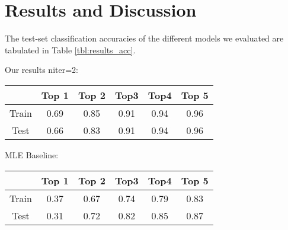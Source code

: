 \section{Results and Discussion}
\label{sec:results}
The test-set classification accuracies of the different models we evaluated are tabulated in Table \ref{tbl:results_acc}.

Our results niter=2:
\begin{tabular}{c|ccccc}
  & Top 1 & Top 2 & Top3 & Top4 & Top 5 \\
  \hline
  Train & 0.69 & 0.85 & 0.91 & 0.94 & 0.96 \\
  Test & 0.66 & 0.83 & 0.91 & 0.94 & 0.96
\end{tabular}

MLE Baseline:
\begin{tabular}{c|ccccc}
  & Top 1 & Top 2 & Top3 & Top4 & Top 5 \\
  \hline
  Train & 0.37 & 0.67 & 0.74 & 0.79 & 0.83 \\
  Test & 0.31 & 0.72 & 0.82 & 0.85 & 0.87
\end{tabular}



